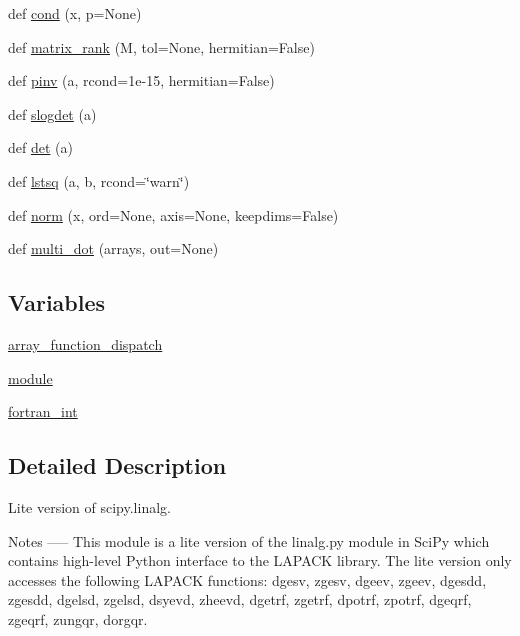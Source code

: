 \begin{DoxyCompactItemize}
def \hyperlink{namespacenumpy_1_1linalg_1_1linalg_ae42d38c76da6351ce6497fd6e673ae6e}{cond} (x, p=None)
\item 
def \hyperlink{namespacenumpy_1_1linalg_1_1linalg_a2f2819f232cf12cf939156d12243225e}{matrix\+\_\+rank} (M, tol=None, hermitian=False)
\item 
def \hyperlink{namespacenumpy_1_1linalg_1_1linalg_ab0895f5825444e6ab48e3fa77468eeb4}{pinv} (a, rcond=1e-\/15, hermitian=\+False)
\item 
def \hyperlink{namespacenumpy_1_1linalg_1_1linalg_a63ee98d66e6ed6c2e7e17a24a8d5304e}{slogdet} (a)
\item 
def \hyperlink{namespacenumpy_1_1linalg_1_1linalg_a6b97f460ca58db032dab55e93d504d9e}{det} (a)
\item 
def \hyperlink{namespacenumpy_1_1linalg_1_1linalg_acbed0e29fc3bbf3f99329ff6c122fb14}{lstsq} (a, b, rcond=\char`\"{}warn\char`\"{})
\item 
def \hyperlink{namespacenumpy_1_1linalg_1_1linalg_a1501a29cdf07bffd60e449124792b6ef}{norm} (x, ord=None, axis=None, keepdims=False)
\item 
def \hyperlink{namespacenumpy_1_1linalg_1_1linalg_adbfb447fdbc4ea61cba348c026fbacf7}{multi\+\_\+dot} (arrays, out=None)
\end{DoxyCompactItemize}
\subsection*{Variables}
\begin{DoxyCompactItemize}
\item 
\hyperlink{namespacenumpy_1_1linalg_1_1linalg_acbaf0497d21f2a1a0cce4283e9b33791}{array\+\_\+function\+\_\+dispatch}
\item 
\hyperlink{namespacenumpy_1_1linalg_1_1linalg_a3fee90608931ae09272b165212d5436a}{module}
\item 
\hyperlink{namespacenumpy_1_1linalg_1_1linalg_a3b5b13c1ab5625fec5215d3a9b5e16ce}{fortran\+\_\+int}
\end{DoxyCompactItemize}


\subsection{Detailed Description}
\begin{DoxyVerb}Lite version of scipy.linalg.

Notes
-----
This module is a lite version of the linalg.py module in SciPy which
contains high-level Python interface to the LAPACK library.  The lite
version only accesses the following LAPACK functions: dgesv, zgesv,
dgeev, zgeev, dgesdd, zgesdd, dgelsd, zgelsd, dsyevd, zheevd, dgetrf,
zgetrf, dpotrf, zpotrf, dgeqrf, zgeqrf, zungqr, dorgqr.
\end{DoxyVerb}
 

